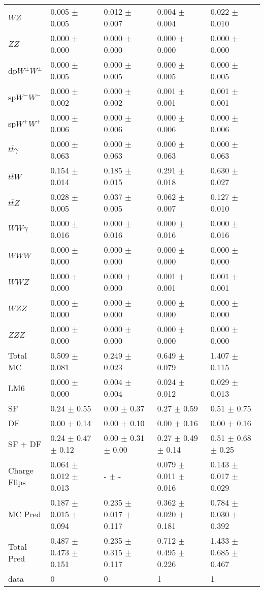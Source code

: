 \begin{tabular}{l | l l l l}
$WZ$ &  0.005 $\pm$  0.005 &  0.012 $\pm$  0.007 &  0.004 $\pm$  0.004 &  0.022 $\pm$  0.010\\
$ZZ$ &  0.000 $\pm$   0.000 &  0.000 $\pm$   0.000 &   0.000 $\pm$   0.000 &   0.000 $\pm$   0.000\\
\hline
dp$W^{\pm}W^{\pm}$ &  0.000 $\pm$  0.005 &  0.000 $\pm$  0.005 &  0.000 $\pm$  0.005 &  0.000 $\pm$  0.005\\
sp$W^{-}W^{-}$ &  0.000 $\pm$  0.002 &  0.000 $\pm$  0.002 &  0.001 $\pm$  0.001 &  0.001 $\pm$  0.001\\
sp$W^{+}W^{+}$ &  0.000 $\pm$  0.006 &  0.000 $\pm$  0.006 &  0.000 $\pm$  0.006 &  0.000 $\pm$  0.006\\
$t\overline{t}\gamma$ &  0.000 $\pm$  0.063 &  0.000 $\pm$  0.063 &  0.000 $\pm$  0.063 &  0.000 $\pm$  0.063\\
$t\overline{t}W$ &  0.154 $\pm$  0.014 &  0.185 $\pm$  0.015 &  0.291 $\pm$  0.018 &  0.630 $\pm$  0.027\\
$t\overline{t}Z$ &  0.028 $\pm$  0.005 &  0.037 $\pm$  0.005 &  0.062 $\pm$  0.007 &  0.127 $\pm$  0.010\\
$WW\gamma$ &  0.000 $\pm$  0.016 &  0.000 $\pm$  0.016 &  0.000 $\pm$  0.016 &  0.000 $\pm$  0.016\\
$WWW$ &  0.000 $\pm$   0.000 &   0.000 $\pm$   0.000 &   0.000 $\pm$   0.000 &   0.000 $\pm$   0.000\\
$WWZ$ &  0.000 $\pm$   0.000 &  0.000 $\pm$   0.000 &  0.001 $\pm$  0.001 &  0.001 $\pm$  0.001\\
$WZZ$ &   0.000 $\pm$   0.000 &   0.000 $\pm$   0.000 &  0.000 $\pm$   0.000 &   0.000 $\pm$   0.000\\
$ZZZ$ &   0.000 $\pm$   0.000 &  0.000 $\pm$   0.000 &   0.000 $\pm$   0.000 &   0.000 $\pm$   0.000\\
\hline
Total MC &  0.509 $\pm$  0.081 &  0.249 $\pm$  0.023 &  0.649 $\pm$  0.079 &  1.407 $\pm$  0.115\\
\hline\hline
\hline
LM6 &  0.000 $\pm$  0.000 &  0.004 $\pm$  0.004 &  0.024 $\pm$  0.012 &  0.029 $\pm$  0.013\\
\hline\hline
\hline\hline
 SF  & 0.24 $\pm$ 0.55 & 0.00 $\pm$ 0.37 & 0.27 $\pm$ 0.59 & 0.51 $\pm$ 0.75\\
 DF  & 0.00 $\pm$ 0.14 & 0.00 $\pm$ 0.10 & 0.00 $\pm$ 0.16 & 0.00 $\pm$ 0.16\\
\hline
 SF + DF  & 0.24 $\pm$ 0.47 $\pm$ 0.12 & 0.00 $\pm$ 0.31 $\pm$ 0.00 & 0.27 $\pm$ 0.49 $\pm$ 0.14 & 0.51 $\pm$ 0.68 $\pm$ 0.25\\
\hline\hline
Charge Flips & 0.064 $\pm$ 0.012 $\pm$ 0.013 & - $\pm$ - & 0.079 $\pm$ 0.011 $\pm$ 0.016 & 0.143 $\pm$ 0.017 $\pm$ 0.029\\
\hline\hline
\hline
MC Pred &  0.187 $\pm$  0.015 $\pm$  0.094 &  0.235 $\pm$  0.017 $\pm$  0.117 &  0.362 $\pm$  0.020 $\pm$  0.181 &  0.784 $\pm$  0.030 $\pm$  0.392\\
\hline\hline
Total Pred &  0.487 $\pm$  0.473 $\pm$  0.151 &  0.235 $\pm$  0.315 $\pm$  0.117 &  0.712 $\pm$  0.495 $\pm$  0.226 &  1.433 $\pm$  0.685 $\pm$  0.467\\
\hline\hline
data & 0 & 0 & 1 & 1\\
\hline\hline
\end{tabular}
